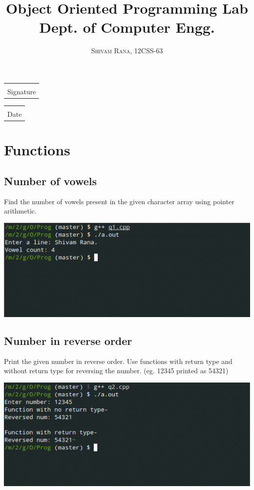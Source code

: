 \documentclass[oneside, a4paper,11pt]{book}
\title{\Huge \textbf{Object Oriented Programming Lab}\\ \huge Dept. of Computer Engg.}
\author{\textsc{Shivam Rana, 12CSS-63}}
\makeatletter
\newcommand{\titledate}[2][2.5in]{%
  \noindent%
  \begin{tabular}{@{}p{#1}@{}}
    \\ \hline \\[-.75\normalbaselineskip]
    #2
  \end{tabular} \hspace{1in}
  \begin{tabular}{@{}p{#1}@{}}
    \\ \hline \\[-.75\normalbaselineskip]
    Date
  \end{tabular}
}
\makeatother
\begin{document}
\lstset{
language=C++,
basicstyle=\small,
keywordstyle=\bfseries,
identifierstyle=,
stringstyle=\ttfamily,
tabsize=4,
showstringspaces=false}

\let\cleardoublepage\clearpage
\maketitle
\tableofcontents

\vfill
\titledate[2in]{Signature}

\pagebreak
\chapter{Functions}
\section{Number of vowels}

Find the number of vowels present in the given character array using pointer arithmetic.


\includegraphics[width=\textwidth]{q1.png}

\section{Number in reverse order}

Print the given number in reverse order. Use functions with return type and without return type for reversing  the number. (eg. 12345 printed as 54321)


\includegraphics[width=\textwidth]{q2.png}
\end{document}
